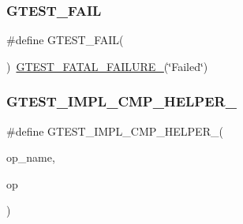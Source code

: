\subsubsection{\texorpdfstring{GTEST\_FAIL}{GTEST\_FAIL}}
{\footnotesize\ttfamily \#define G\+T\+E\+S\+T\+\_\+\+F\+A\+IL(\begin{DoxyParamCaption}{ }\end{DoxyParamCaption})~\mbox{\hyperlink{_obj__test_2lib_2googletest-release-1_88_81_2googletest_2include_2gtest_2internal_2gtest-internal_8h_a0f9a4c3ea82cc7bf4478eaffdc168358}{G\+T\+E\+S\+T\+\_\+\+F\+A\+T\+A\+L\+\_\+\+F\+A\+I\+L\+U\+R\+E\+\_\+}}(\char`\"{}Failed\char`\"{})}

\mbox{\label{_obj__test_2lib_2googletest-release-1_88_81_2googletest_2include_2gtest_2gtest_8h_a4a5b6fbde5dd05e05dd6846ac5e5c18e}} 
\subsubsection{\texorpdfstring{GTEST\_IMPL\_CMP\_HELPER\_}{GTEST\_IMPL\_CMP\_HELPER\_}}
{\footnotesize\ttfamily \#define G\+T\+E\+S\+T\+\_\+\+I\+M\+P\+L\+\_\+\+C\+M\+P\+\_\+\+H\+E\+L\+P\+E\+R\+\_\+(\begin{DoxyParamCaption}\item[{}]{op\+\_\+name,  }\item[{}]{op }\end{DoxyParamCaption})}

